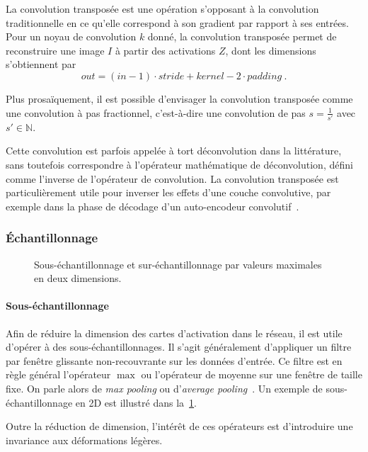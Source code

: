 La convolution transposée est une opération s'opposant à la convolution traditionnelle en ce qu'elle correspond à son gradient par rapport à ses entrées. Pour un noyau de convolution $k$ donné, la convolution transposée permet de reconstruire une image $I$ à partir des activations $Z$, dont les dimensions s'obtiennent par
$$\mathit{out} = (\mathit{in} - 1) \cdot \mathit{stride} + \mathit{kernel} - 2 \cdot \mathit{padding}~.$$

Plus prosaïquement, il est possible d'envisager la convolution transposée comme une convolution à pas fractionnel, c'est-à-dire une convolution de pas $s = \frac{1}{s'}$ avec $s' \in \mathbb{N}$.

Cette convolution est parfois appelée à tort \og déconvolution \fg dans la littérature, sans toutefois correspondre à l'opérateur mathématique de déconvolution, défini comme l'inverse de l'opérateur de convolution. La convolution transposée est particulièrement utile pour inverser les effets d'une couche convolutive, par exemple dans la phase de décodage d'un auto-encodeur convolutif~\cite{zhao_stacked_2015-1}.

\subsubsection{Échantillonnage}

\begin{figure}
  \resizebox{\textwidth}{!}{
  
  }
  \caption{Sous-échantillonnage et sur-échantillonnage par valeurs maximales en deux dimensions.}
  \label{fig:pooling}
\end{figure}

\paragraph{Sous-échantillonnage}

Afin de réduire la dimension des cartes d'activation dans le réseau, il est utile d'opérer à des sous-échantillonnages. Il s'agit généralement d'appliquer un filtre par fenêtre glissante non-recouvrante sur les données d'entrée. Ce filtre est en règle général l'opérateur $\max$ ou l'opérateur de moyenne sur une fenêtre de taille fixe. On parle alors de \emph{max pooling} ou d'\emph{average pooling}~\cite{zhou_stereo_1988}. Un exemple de sous-échantillonnage en 2D est illustré dans la~\cref{fig:pooling}.

Outre la réduction de dimension, l'intérêt de ces opérateurs est d'introduire une invariance aux déformations légères.

